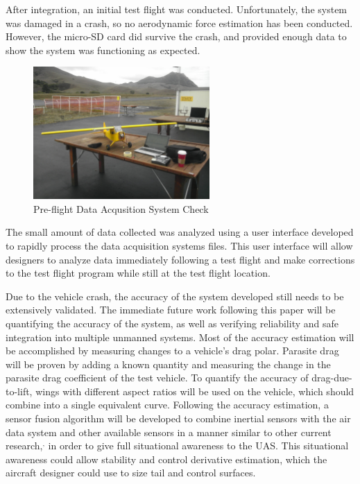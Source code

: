 After integration, an initial test flight was conducted. Unfortunately, the system was damaged in a crash, so no aerodynamic force estimation has been conducted. However, the micro-SD card did survive the crash, and provided enough data to show the system was functioning as expected.
\begin{figure}[H]
\label{preFlightFig}
  \centering

    \includegraphics[width=0.6\textwidth]{figures/preFlight.jpg}
  \caption{Pre-flight Data Acqusition System Check}
\end{figure}
 The small amount of data collected was analyzed using a user interface developed to rapidly process the data acquisition systems files. This user interface will allow designers to analyze data immediately following a test flight and make corrections to the test flight program while still at the test flight location.
 
 Due to the vehicle crash, the accuracy of the system developed still needs to be extensively validated. The immediate future work following this paper will be quantifying the accuracy of the system, as well as verifying reliability and safe integration into multiple unmanned systems. Most of the accuracy estimation will be accomplished by measuring changes to a vehicle's drag polar. Parasite drag will be proven by adding a known quantity and measuring the change in the parasite drag coefficient of the test vehicle. To quantify the accuracy of drag-due-to-lift, wings with different aspect ratios will be used on the vehicle, which should combine into a single equivalent curve\cite{prandtl1923applications}. Following the accuracy estimation, a sensor fusion algorithm will be developed to combine inertial sensors with the air data system and other available sensors in a manner similar to other current research,\cite{wvINSAirData}$^,$\cite{gtUKF} in order to give full situational awareness to the UAS. This situational awareness could allow stability and control derivative estimation, which the aircraft designer could use to size tail and control surfaces.